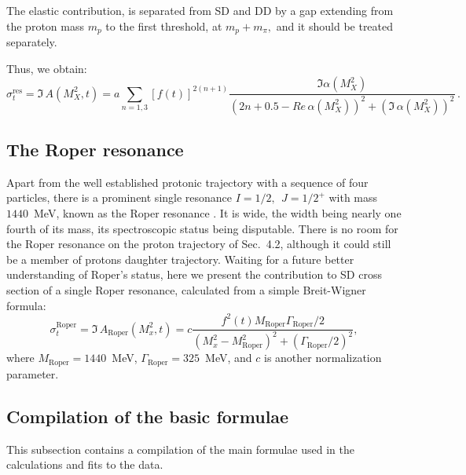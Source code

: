 \documentclass[12pt]{article}
\begin{document}
The elastic contribution, is separated from SD and DD by a gap extending from the proton mass $m_p$ to the first threshold, at $m_p+m_{\pi},$
and it should be treated separately.

 Thus, we obtain:
\begin{equation}\label{ImA_fin}
    \sigma_{t}^\mathrm{res}=\Im\, A(M_X^2,t)=     a\sum\limits_{n=1,3}[f(t)]^{2(n+1)}
    \frac{\Im\alpha(M^2_X)}{(2n+0.5-Re\, \alpha(M_X^2))^2+(\Im\, \alpha(M_X^2))^2}\,.%
\end{equation}

\subsection{The Roper resonance \label{Roper}}
Apart from the well established protonic trajectory
with a sequence of four particles, there is a prominent single resonance
$I=1/2,\ \  J=1/2^+$ with mass $1440$~MeV, known as the Roper
resonance \cite{particles}. It is wide, the width being nearly one
fourth of its mass, its spectroscopic status being disputable.
There is no room for the Roper resonance on the proton trajectory
of Sec.~4.2, although it could still be a member of protons
daughter trajectory. Waiting for a future better understanding of Roper's status, here we
present the contribution to SD cross section of a single Roper
resonance, calculated from a simple
Breit-Wigner formula:
\begin{equation}\label{Roper_eq}
 \sigma_{t}^\mathrm{Roper}=\Im\, A_\mathrm{Roper}(M_x^2,t)=
c\frac{f^2(t) M_\mathrm{Roper} \Gamma_\mathrm{Roper}/2 }{(M^2_x - M^2_\mathrm{Roper})^2 + (\Gamma_\mathrm{Roper}/2)^2},
\end{equation}
where $M_\mathrm{Roper} = 1440$~MeV, $\Gamma_\mathrm{Roper} = 325$~MeV,  and $c$ is another normalization parameter.

\subsection{Compilation of the basic formulae}
This subsection contains a compilation of the main formulae used in the calculations and fits to the data.
\end{document}

